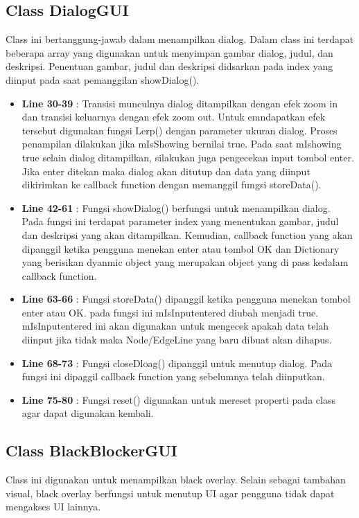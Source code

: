 \documentclass[12pt,a4paper,oneside]{article}
\begin{document}
\subsection{Class DialogGUI}
Class ini bertanggung-jawab dalam menampilkan dialog. Dalam class ini terdapat beberapa array yang digunakan untuk menyimpan gambar dialog, judul, dan deskripsi. Penentuan gambar, judul dan deskripsi didsarkan pada index yang diinput pada saat pemanggilan showDialog().
\begin{itemize}
	\item \textbf{Line 30-39} : Transisi munculnya dialog ditampilkan dengan efek zoom in dan transisi keluarnya dengan efek zoom out. Untuk emndapatkan efek tersebut digunakan fungsi Lerp() dengan parameter ukuran dialog. Proses penampilan dilakukan jika mIsShowing bernilai true. Pada saat mIshowing true selain dialog ditampilkan, silakukan juga pengecekan input tombol enter. Jika enter ditekan maka dialog akan ditutup dan data yang diinput dikirimkan ke callback function dengan memanggil fungsi storeData().
	\item \textbf{Line 42-61} : Fungsi showDialog() berfungsi untuk menampilkan dialog. Pada fungsi ini terdapat parameter index yang menentukan gambar, judul dan deskripsi yang akan ditampilkan. Kemudian, callback function yang akan dipanggil ketika pengguna menekan enter atau tombol OK dan Dictionary yang berisikan dyanmic object yang merupakan object yang di pass kedalam callback function.
	\item \textbf{Line 63-66} : Fungsi storeData() dipanggil ketika pengguna menekan tombol enter atau OK. pada fungsi ini mIsInputentered diubah menjadi true. mIsInputentered ini akan digunakan untuk mengecek apakah data telah diinput jika tidak maka Node/EdgeLine yang baru dibuat akan dihapus.
	\item \textbf{Line 68-73} : Fungsi closeDloag() dipanggil untuk menutup dialog. Pada fungsi ini dipaggil callback function yang sebelumnya telah diinputkan.
	\item \textbf{Line 75-80} : Fungsi reset() digunakan untuk mereset properti pada class agar dapat digunakan kembali.  
\end{itemize}
\subsection{Class BlackBlockerGUI}
Class ini digunakan untuk menampilkan black overlay. Selain sebagai tambahan visual, black overlay berfungsi untuk menutup UI agar pengguna tidak dapat mengakses UI lainnya.
\end{document}
